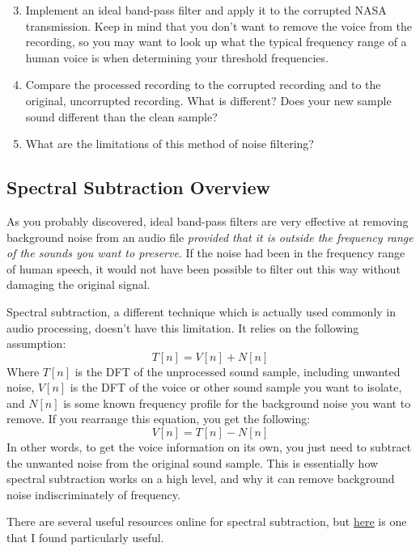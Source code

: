 \documentclass{tufte-handout}
\begin{document}
\begin{enumerate}
	\setcounter{enumi}{2}
	\item Implement an ideal band-pass filter and apply it to the corrupted NASA transmission. Keep in mind that you don't want to remove the voice from the recording, so you may want to look up what the typical frequency range of a human voice is when determining your threshold frequencies.
	\item Compare the processed recording to the corrupted recording and to the original, uncorrupted recording. What is different? Does your new sample sound different than the clean sample?
	\item What are the limitations of this method of noise filtering?
\end{enumerate}

\subsection{Spectral Subtraction Overview}
As you probably discovered, ideal band-pass filters are very effective at removing background noise from an audio file \textit{provided that it is outside the frequency range of the sounds you want to preserve}. If the noise had been in the frequency range of human speech, it would not have been possible to filter out this way without damaging the original signal.

Spectral subtraction, a different technique which is actually used commonly in audio processing, doesn't have this limitation. It relies on the following assumption:
\begin{equation}
	T[n] = V[n] + N[n]
\end{equation}
Where $T[n]$  is the DFT of the unprocessed sound sample, including unwanted noise, $V[n]$ is the DFT of the voice or other sound sample you want to isolate, and $N[n]$ is some known frequency profile for the background noise you want to remove. If you rearrange this equation, you get the following:
\begin{equation}
	V[n] = T[n] - N[n]
\end{equation}
In other words, to get the voice information on its own, you just need to subtract the unwanted noise from the original sound sample. This is essentially how spectral subtraction works on a high level, and why it can remove background noise indiscriminately of frequency.

There are several useful resources online for spectral subtraction, but \href{http://practicalcryptography.com/miscellaneous/machine-learning/tutorial-spectral-subraction/}{here} is one that I found particularly useful.
\end{document}
